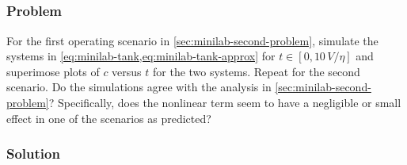 \documentclass[12pt]{article}
\begin{document}
\subsection{}
\subsubsection*{Problem}
For the first operating scenario in \cref{sec:minilab-second-problem}, simulate
the systems in \cref{eq:minilab-tank,eq:minilab-tank-approx} for
$t\in[0,10\,V/\eta]$ and superimose plots of $c$ versus $t$ for the two systems.
Repeat for the second scenario. Do the simulations agree with the analysis in
\cref{sec:minilab-second-problem}? Specifically, does the nonlinear term seem
to have a negligible or small effect in one of the scenarios as predicted?

\subsubsection*{Solution}
\todo
\end{document}
